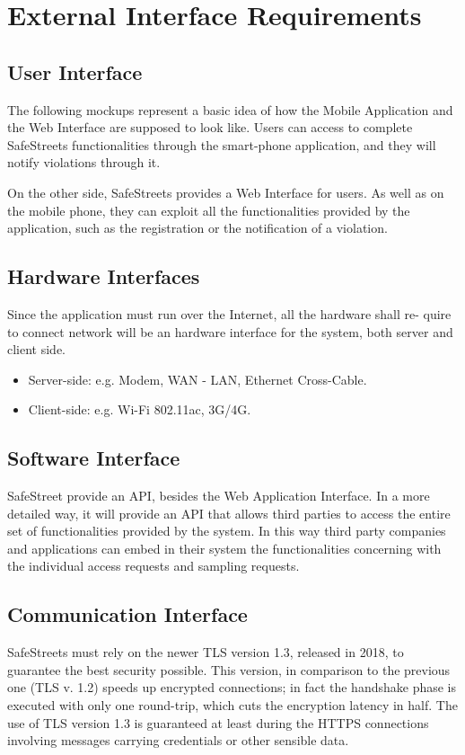 \section{External Interface Requirements}

\subsection{User Interface}
The following mockups represent a basic idea of how the Mobile Application
and the Web Interface are supposed to look like.
Users can access to complete SafeStreets functionalities through the smart-phone application, and they will notify violations through it.

On the other side, SafeStreets provides a Web Interface for users. As well as on the mobile phone, 
they can exploit all the functionalities provided by the application, such as the registration or the notification of a violation.

\subsection{Hardware Interfaces}
Since the application must run over the Internet, all the hardware shall re-
quire to connect network will be an hardware interface for the system, both
server and client side.
\begin{itemize}
  \item Server-side: e.g. Modem, WAN - LAN, Ethernet Cross-Cable.
  \item Client-side: e.g. Wi-Fi 802.11ac, 3G/4G. 
\end{itemize}


\subsection{Software Interface}
SafeStreet provide an API, besides the Web Application Interface.
In a more detailed way, it will provide an API that allows third parties to access
the entire set of functionalities provided by the system. In this way 
third party companies and applications can embed in their system the
functionalities concerning with the individual access requests and sampling
requests.

\subsection{Communication Interface}
SafeStreets must rely on the newer TLS version 1.3, released in 2018, to guarantee the best
security possible. This version, in comparison to the previous one (TLS v. 1.2) speeds up encrypted connections;
in fact the handshake phase is executed with only one round-trip, which cuts the encryption latency in half.
The use of TLS version 1.3 is guaranteed at least during the HTTPS connections involving messages
carrying credentials or other sensible data.
